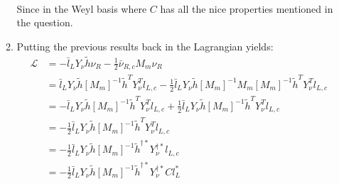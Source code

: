 \documentclass[12pt,a4]{article}
\begin{document}
\begin{enumerate}
\begin{enumerate}
\begin{align*}
        \end{align*}
        Since in the Weyl basis where $C$ has all the nice properties mentioned in the question.
      \item 
        Putting the previous results back in the Lagrangian yields:
        \begin{align*}
          \mathcal{L} &= - \bar{l}_L Y_\nu \tilde{h} \nu_R - \frac{1}{2} \bar{\nu}_{R,c} M_m \nu_R\\
                      &= \bar{l}_L Y_\nu \tilde{h} [M_m ]^{-1} \tilde{h}^T Y_\nu^T l_{L,c} - \frac{1}{2} \bar{l}_L Y_\nu \tilde{h} [M_m ]^{-1} M_m [M_m ]^{-1} \tilde{h}^T Y_\nu^T l_{L,c}\\
                      &= - \bar{l}_L Y_\nu \tilde{h} [M_m ]^{-1} \tilde{h}^T Y_\nu^T l_{L,c} + \frac{1}{2} \bar{l}_L Y_\nu \tilde{h} [M_m ]^{-1} \tilde{h}^T Y_\nu^T l_{L,c}\\
                      &= - \frac{1}{2}\bar{l}_L Y_\nu \tilde{h} [M_m ]^{-1} \tilde{h}^T Y_\nu^T l_{L,c} \\
                      &= - \frac{1}{2}\bar{l}_L Y_\nu \tilde{h} [M_m ]^{-1} \tilde{h}^{\dagger*} Y_\nu^{\dagger*} l_{L,c} \\
                      &= - \frac{1}{2}\bar{l}_L Y_\nu \tilde{h}  [M_m ]^{-1} \tilde{h}^{\dagger*} Y_\nu^{\dagger*} C l_{L}^* \\

\end{align*}
\end{enumerate}
\end{enumerate}
\end{document}

